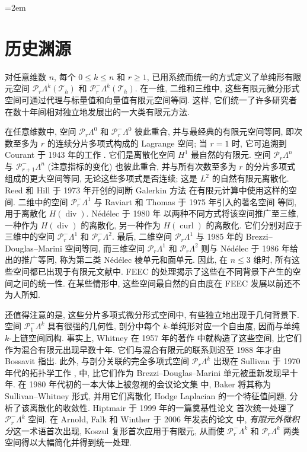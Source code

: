 \endgroup
\begingroup\emergencystretch=2em
\section{历史渊源}\label{sec:historical-antecedents}

对任意维数 $n$, 每个 $0\leq k\leq n$ 和 $r\geq1$, 已用系统而统一的方式定义了单纯形有限元空间 $\mathcal P_r\Lambda^k(\mathcal T_h)$ 和 $\mathcal P_r^-\Lambda^k(\mathcal T_h)$. 在一维, 二维和三维中, 这些有限元微分形式空间可通过代理与标量值和向量值有限元空间等同. 这样, 它们统一了许多研究者在数十年间相对独立地发展出的一大类有限元方法.

在任意维数中, 空间 $\mathcal P_r\Lambda^0$ 和 $\mathcal P_r^-\Lambda^0$ 彼此重合, 并与最经典的有限元空间等同, 即次数至多为 $r$ 的连续分片多项式构成的 Lagrange 空间; 当 $r=1$ 时, 它可追溯到 Courant 于 1943 年的工作 . 它们是离散化空间 $H^1$ 最自然的有限元. 空间 $\mathcal P_r\Lambda^n$ 与 $\mathcal P_{r+1}^-\Lambda^n$ (注意指标的变化) 也彼此重合, 并与所有次数至多为 $r$ 的分片多项式组成的更大空间等同, 无论这些多项式是否连续; 这是 $L^2$ 的自然有限元离散化. Reed 和 Hill 于 1973 年开创的间断 Galerkin 方法  在有限元计算中使用这样的空间. 二维中的空间 $\mathcal P_r^-\Lambda^1$ 与 Raviart 和 Thomas 于 1975 年引入的著名空间  等同, 用于离散化 $H(\operatorname{div})$. Nédélec 于 1980 年  以两种不同方式将该空间推广至三维, 一种作为 $H(\operatorname{div})$ 的离散化, 另一种作为 $H(\operatorname{curl})$ 的离散化. 它们分别对应于三维中的空间 $\mathcal P_r^-\Lambda^1$ 和 $\mathcal P_r^-\Lambda^2$. 最后, 二维空间 $\mathcal P_r\Lambda^1$ 与 1985 年的 Brezzi–Douglas–Marini 空间等同, 而三维空间 $\mathcal P_r\Lambda^1$ 和 $\mathcal P_r\Lambda^2$ 则与 Nédélec 于 1986 年给出的推广等同, 称为第二类 Nédélec 棱单元和面单元. 因此, 在 $n\leq3$ 维时, 所有这些空间都已出现于有限元文献中. FEEC 的处理揭示了这些在不同背景下产生的空间之间的统一性. 在某些情形中, 这些空间最自然的自由度在 FEEC 发展以前还不为人所知.

还值得注意的是, 这些分片多项式微分形式空间中, 有些独立地出现于几何背景下. 空间 $\mathcal P_1^-\Lambda^k$ 具有很强的几何性, 剖分中每个 $k$-单纯形对应一个自由度, 因而与单纯 $k$-上链空间同构. 事实上, Whitney 在 1957 年的著作  中就构造了这些空间, 比它们作为混合有限元出现早数十年. 它们与混合有限元的联系则迟至 1988 年才由 Bossavit  指出. 此外, 与剖分关联的完全多项式空间 $\mathcal P_r\Lambda^k$ 出现在 Sullivan 于 1970 年代的拓扑学工作 ,  中, 比它们作为 Brezzi–Douglas–Marini 单元被重新发现早十年. 在 1980 年代初的一本大体上被忽视的会议论文集  中, Baker 将其称为 Sullivan–Whitney 形式, 并用它们离散化 Hodge Laplacian 的一个特征值问题, 分析了该离散化的收敛性. Hiptmair 于 1999 年的一篇奠基性论文  首次统一处理了 $\mathcal P_r^-\Lambda^k$ 空间. 在 Arnold, Falk 和 Winther 于 2006 年发表的论文  中, \emph{有限元外微积分}这一术语首次出现, Koszul 复形首次应用于有限元, 从而使 $\mathcal P_r^-\Lambda^k$ 和 $\mathcal P_r\Lambda^k$ 两类空间得以大幅简化并得到统一处理.


